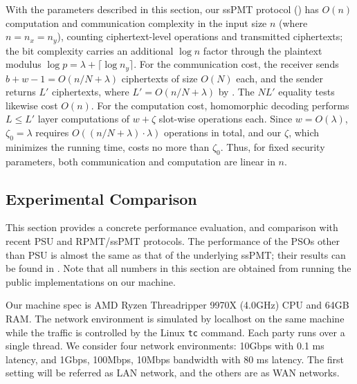 With the parameters described in this section, our ssPMT protocol () has $O(n)$ computation and communication complexity in the input size $n$ (where $n=n_x=n_y$), counting ciphertext-level operations and transmitted ciphertexts; the bit complexity carries an additional $\log n$ factor through the plaintext modulus $\log p = \lambda + \lceil\log n_y\rceil$. For the communication cost, the receiver sends $b+w-1 = O(n/N+\lambda)$ ciphertexts of size $O(N)$ each, and the sender returns $L'$ ciphertexts, where $L' = O(n/N+\lambda)$ by . The $NL'$ equality tests likewise cost $O(n)$. For the computation cost, homomorphic decoding performs $L \le L'$ layer computations of $w+\zeta$ slot-wise operations each. Since $w = O(\lambda)$, $\zeta_0 = \lambda$ requires $O((n/N+\lambda)\cdot\lambda)$ operations in total, and our $\zeta$, which minimizes the running time, costs no more than $\zeta_0$. Thus, for fixed security parameters, both communication and computation are linear in $n$.

\subsection{Experimental Comparison}\label{subsec:experimental comparison}
This section provides a concrete performance evaluation, and comparison with recent PSU and RPMT/ssPMT protocols. The performance of the PSOs other than PSU is almost the same as that of the underlying ssPMT; their results can be found in . Note that all numbers in this section are obtained from running the public implementations on our machine. 


Our machine spec is AMD Ryzen Threadripper 9970X (4.0GHz) CPU and 64GB RAM. The network environment is simulated by localhost on the same machine while the traffic is controlled by the Linux \texttt{tc} command. Each party runs over a single thread. We consider four network environments: 10Gbps with 0.1 ms latency, and 1Gbps, 100Mbps, 10Mbps bandwidth with 80 ms latency. The first setting will be referred as LAN network, and the others are as WAN networks.

